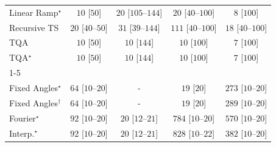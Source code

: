 \begin{tabular}{l|cccc|}
Linear Ramp$^\star$ & {\cellcolor[HTML]{F7FCF5}} \color[HTML]{000000} $10$ [$50$] & {\cellcolor[HTML]{F5FBF2}} \color[HTML]{000000} $20$ [$105$--$144$] & {\cellcolor[HTML]{F5FBF2}} \color[HTML]{000000} $20$ [$40$--$100$] & {\cellcolor[HTML]{F7FCF5}} \color[HTML]{000000} $8$ [$100$] \\
Recursive TS & {\cellcolor[HTML]{F5FBF2}} \color[HTML]{000000} $20$ [$40$--$50$] & {\cellcolor[HTML]{F3FAF0}} \color[HTML]{000000} $31$ [$39$--$144$] & {\cellcolor[HTML]{E5F5E0}} \color[HTML]{000000} $111$ [$40$--$100$] & {\cellcolor[HTML]{F5FBF3}} \color[HTML]{000000} $18$ [$40$--$100$] \\
TQA & {\cellcolor[HTML]{F7FCF5}} \color[HTML]{000000} $10$ [$50$] & {\cellcolor[HTML]{F7FCF5}} \color[HTML]{000000} $10$ [$144$] & {\cellcolor[HTML]{F7FCF5}} \color[HTML]{000000} $10$ [$100$] & {\cellcolor[HTML]{F7FCF5}} \color[HTML]{000000} $7$ [$100$] \\
TQA$^\star$ & {\cellcolor[HTML]{F7FCF5}} \color[HTML]{000000} $10$ [$50$] & {\cellcolor[HTML]{F7FCF5}} \color[HTML]{000000} $10$ [$144$] & {\cellcolor[HTML]{F7FCF5}} \color[HTML]{000000} $10$ [$100$] & {\cellcolor[HTML]{F7FCF5}} \color[HTML]{000000} $7$ [$100$] \\
\cline{1-5}
\multicolumn{5}{c}{\rule{0pt}{8pt}SV} \\
\midrule
Fixed Angles$^\star$ & {\cellcolor[HTML]{EDF8EA}} \color[HTML]{000000} $64$ [$10$--$20$] & {\cellcolor[HTML]{000000}} \color[HTML]{F1F1F1} {\cellcolor{white}} \color{black} - & {\cellcolor[HTML]{F5FBF3}} \color[HTML]{000000} $19$ [$20$] & {\cellcolor[HTML]{B1E0AB}} \color[HTML]{000000} $273$ [$10$--$20$] \\
Fixed Angles$^\dagger$ & {\cellcolor[HTML]{EDF8EA}} \color[HTML]{000000} $64$ [$10$--$20$] & {\cellcolor[HTML]{000000}} \color[HTML]{F1F1F1} {\cellcolor{white}} \color{black} - & {\cellcolor[HTML]{F5FBF3}} \color[HTML]{000000} $19$ [$20$] & {\cellcolor[HTML]{ABDDA5}} \color[HTML]{000000} $289$ [$10$--$20$] \\
Fourier$^\star$ & {\cellcolor[HTML]{E8F6E4}} \color[HTML]{000000} $92$ [$10$--$20$] & {\cellcolor[HTML]{F5FBF2}} \color[HTML]{000000} $20$ [$12$--$21$] & {\cellcolor[HTML]{005522}} \color[HTML]{F1F1F1} $784$ [$10$--$20$] & {\cellcolor[HTML]{329B51}} \color[HTML]{F1F1F1} $570$ [$10$--$20$] \\
Interp.$^\star$ & {\cellcolor[HTML]{E8F6E4}} \color[HTML]{000000} $92$ [$10$--$20$] & {\cellcolor[HTML]{F5FBF2}} \color[HTML]{000000} $20$ [$12$--$21$] & {\cellcolor[HTML]{00441B}} \color[HTML]{F1F1F1} $828$ [$10$--$22$] & {\cellcolor[HTML]{84CC83}} \color[HTML]{000000} $382$ [$10$--$20$] \\

\end{tabular}
